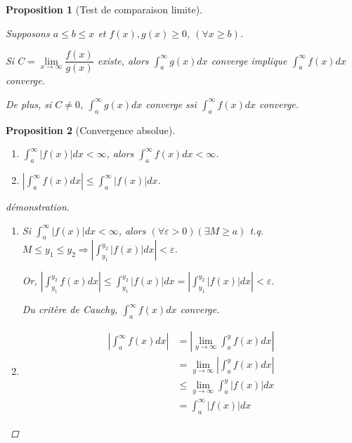 \documentclass{report}
\newcommand*{\abs}[1]{\left| #1 \right|}
\newcommand*{\eps}{\varepsilon}
\newtheorem*{prop}{Proposition}
\theoremstyle{definition}
\theoremstyle{remark}
\begin{document}
	\begin{prop}[Test de comparaison limite]~

		Supposons $a \leq b \leq x$ et $f(x),g(x) \geq 0$, $(\forall x \geq b)$.

		Si $C = \lim\limits_{x \to \infty}\dfrac{f(x)}{g(x)}$ existe, alors $\displaystyle\int_{a}^{\infty}g(x)dx$ converge implique $\displaystyle\int_{a}^{\infty}f(x)dx$ converge.

		De plus, si $C \neq 0$, $\displaystyle\int_{a}^{\infty}g(x)dx$ converge ssi $\displaystyle\int_{a}^{\infty}f(x)dx$ converge.
	\end{prop}
	\begin{prop}[Convergence absolue]~

		\begin{enumerate}[label=\alph*)]
			\item $\displaystyle\int_{a}^{\infty}\abs{f(x)}dx < \infty$, alors $\displaystyle\int_{a}^{\infty}f(x)dx < \infty$.
			\item $\abs{\displaystyle\int_{a}^{\infty}{ f(x)dx}} \leq \displaystyle\int_{a}^{\infty}\abs{f(x)}dx$.
		\end{enumerate}
		\begin{proof}[d\'emonstration]~

			\begin{enumerate}[label=\alph*)]
				\item Si $\displaystyle\int_{a}^{\infty}\abs{f(x)}dx < \infty$, alors $(\forall\eps>0) (\exists M \geq a)$ t.q. $M \leq y_1 \leq y_2 \Rightarrow \abs{\displaystyle\int_{y_1}^{y_2}\abs{f(x)}dx}<\eps$.

				Or, $\abs{\displaystyle\int_{y_1}^{y_2}f(x)dx} \leq \displaystyle\int_{y_1}^{y_2}\abs{f(x)}dx = \abs{\displaystyle\int_{y_1}^{y_2}\abs{f(x)}dx} < \eps$.

				Du crit\`ere de Cauchy, $\displaystyle\int_{a}^{\infty}f(x)dx$ converge.
				\newpage
				\item
				\begin{align*}
					\abs{\int_{a}^{\infty}f(x)dx}&= \abs{\lim_{y \to \infty}\int_{a}^{y}f(x)dx}\\
					&= \lim_{y \to \infty}\abs{\int_{a}^{y}f(x)dx}\\
					&\leq \lim_{y \to \infty}\int_{a}^{y}\abs{f(x)}dx\\
					&= \int_{a}^{\infty}\abs{f(x)}dx
				\end{align*}
			\end{enumerate}
		\end{proof}
	\end{prop}
\end{document}
